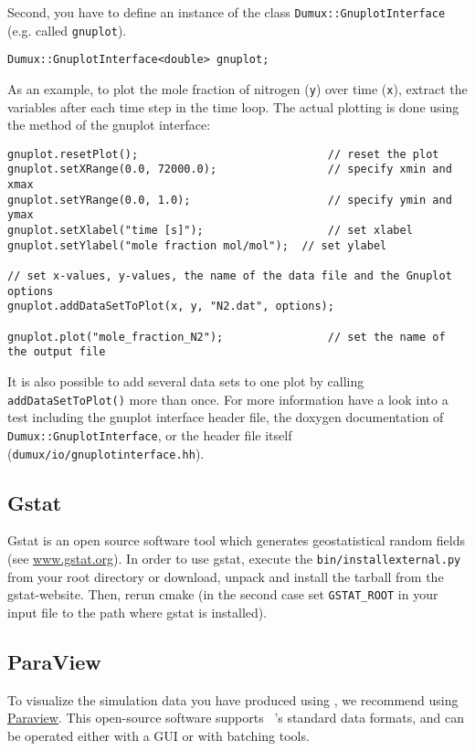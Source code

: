 Second, you have to define an instance of the class \texttt{Dumux::GnuplotInterface} (e.g. called \texttt{gnuplot}).
\begin{lstlisting}[style=DumuxCode]
Dumux::GnuplotInterface<double> gnuplot;
\end{lstlisting}

As an example, to plot the mole fraction of nitrogen (\texttt{y}) over time (\texttt{x}),
extract the variables after each time step in the time loop.
The actual plotting is done using the method of the gnuplot interface:

\begin{lstlisting}[style=DumuxCode]
gnuplot.resetPlot();                             // reset the plot
gnuplot.setXRange(0.0, 72000.0);                 // specify xmin and xmax
gnuplot.setYRange(0.0, 1.0);                     // specify ymin and ymax
gnuplot.setXlabel("time [s]");                   // set xlabel
gnuplot.setYlabel("mole fraction mol/mol");  // set ylabel

// set x-values, y-values, the name of the data file and the Gnuplot options
gnuplot.addDataSetToPlot(x, y, "N2.dat", options);

gnuplot.plot("mole_fraction_N2");                // set the name of the output file
\end{lstlisting}

It is also possible to add several data sets to one plot by calling \texttt{addDataSetToPlot()} more than once.
For more information have a look into a test including the gnuplot interface header file, the doxygen documentation
of \texttt{Dumux::GnuplotInterface}, or the header file itself (\texttt{dumux/io/gnuplotinterface.hh}).


\subsection{Gstat}
Gstat is an open source software tool which generates geostatistical random fields (see \url{www.gstat.org}).
In order to use gstat, execute the \texttt{bin/installexternal.py} from your \Dumux root
directory or download, unpack and install the tarball from the gstat-website.
Then, rerun cmake (in the second case set \texttt{GSTAT\_ROOT} in your input file to the
path where gstat is installed).


\subsection{ParaView} \label{ssec:paraview}
To visualize the simulation data you have produced using \Dumux, we recommend using \href{https://www.paraview.org/}{Paraview}. 
This open-source software supports \Dumux~'s standard data formats, and can be operated either with a GUI or with batching tools. 